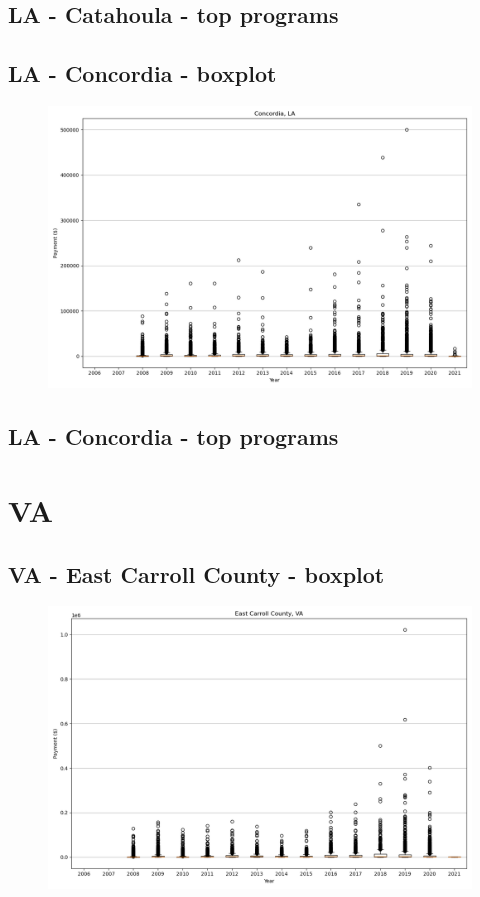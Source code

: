\subsection*{LA - Catahoula - top programs}

\newpage
\subsection*{LA - Concordia - boxplot}
\begin{figure}[h]
\centering
\includegraphics[width=7in]{../output/boxplots/counties/Concordia-LA_boxplot.png}
\end{figure}


\subsection*{LA - Concordia - top programs}

\newpage
\section*{VA}
\subsection*{VA - East Carroll County - boxplot}
\begin{figure}[h]
\centering
\includegraphics[width=7in]{../output/boxplots/counties/East Carroll County-VA_boxplot.png}
\end{figure}



